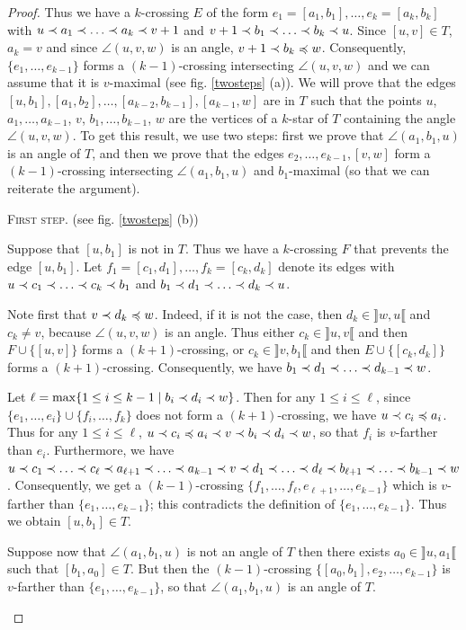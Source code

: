 \documentclass[12pt]{amsart}
\begin{document}
\begin{proof}
Thus we have a $k$-crossing $E$ of the form $e_1=[a_1,b_1],\ldots,e_k=[a_k,b_k]$ with $u\prec a_1\prec \ldots\prec a_k\prec v+1$ and $v+1\prec b_1\prec \ldots\prec b_k\prec u$. Since $[u,v]\in T$, $a_k=v$ and since $\angle(u,v,w)$ is an angle, $v+1\prec b_k\preccurlyeq w$. Consequently, $\{e_1,\ldots,e_{k-1}\}$ forms a $(k-1)$-crossing intersecting $\angle(u,v,w)$ and we can assume that it is $v$-maximal (see fig. \ref{twosteps} (a)). We will prove that the edges $[u,b_1], [a_1,b_2],\ldots, [a_{k-2},b_{k-1}],[a_{k-1},w]$ are in $T$ such that the points $u$, $a_1,\ldots,a_{k-1}$, $v$, $b_1,\ldots,b_{k-1}$, $w$ are the vertices of a $k$-star of $T$ containing the angle $\angle(u,v,w)$. To get this result, we use two steps: first we prove that $\angle(a_1,b_1,u)$ is an angle of $T$, and then we prove that the edges $e_2,\ldots,e_{k-1},[v,w]$ form a $(k-1)$-crossing intersecting $\angle(a_1,b_1,u)$ and $b_1$-maximal (so that we can reiterate the argument).

\medskip
\noindent\textsc{First step.}  (see fig. \ref{twosteps} (b))

Suppose that $[u,b_1]$ is not in $T$. Thus we have a $k$-crossing $F$ that prevents the edge $[u,b_1]$. Let $f_1=[c_1,d_1],\ldots,f_k=[c_k,d_k]$ denote its edges with $u\prec c_1\prec \ldots\prec c_k\prec b_1$ and $b_1\prec d_1\prec \ldots\prec d_k\prec u$.

Note first that $v\prec d_k\preccurlyeq w$. Indeed, if it is not the case, then $d_k\in\rrbracket w,u\llbracket$ and $c_k\ne v$, because $\angle(u,v,w)$ is an angle. Thus either $c_k\in\rrbracket u,v\llbracket$ and  then $F\cup\{[u,v]\}$ forms a $(k+1)$-crossing, or $c_k\in\rrbracket v,b_1\llbracket$ and  then $E\cup\{[c_k,d_k]\}$ forms a $(k+1)$-crossing. Consequently, we have $b_1\prec d_1\prec \ldots\prec d_{k-1}\prec w$.

Let $\ell=\max\{1\le i\le {k-1}\;|\; b_i\prec d_i\prec w\}$. Then for any $1\le i\le\ell$, since $\{e_1,\ldots,e_i\}\cup\{f_i,\ldots,f_k\}$ does not form a $(k+1)$-crossing, we have $u\prec c_i\preccurlyeq a_i$. Thus for any $1\le i\le\ell$, $u\prec c_i\preccurlyeq a_i\prec v\prec b_i\prec d_i\prec w$, so that $f_i$ is $v$-farther than $e_i$. Furthermore, we have $u\prec c_1\prec \ldots\prec c_\ell\prec a_{\ell+1}\prec\ldots\prec a_{k-1}\prec v\prec d_1\prec\ldots\prec d_\ell\prec b_{\ell+1}\prec \ldots\prec b_{k-1}\prec w$. Consequently, we get a $(k-1)$-crossing $\{f_1,\ldots,f_\ell,e_{\ell+1},\ldots,e_{k-1}\}$ which is $v$-farther than $\{e_1,\ldots,e_{k-1}\}$; this contradicts the definition of $\{e_1,\ldots,e_{k-1}\}$. Thus we obtain $[u,b_1]\in T$.

Suppose now that $\angle(a_1,b_1,u)$ is not an angle of $T$ then there exists $a_0\in \rrbracket u,a_1\llbracket$ such that $[b_1,a_0]\in T$. But then the $(k-1)$-crossing $\{[a_0,b_1],e_2,\ldots,e_{k-1}\}$ is $v$-farther than $\{e_1,\ldots,e_{k-1}\}$, so that $\angle(a_1,b_1,u)$ is an angle of $T$.
\begin{figure}


\end{figure}
\end{proof}
\end{document}
